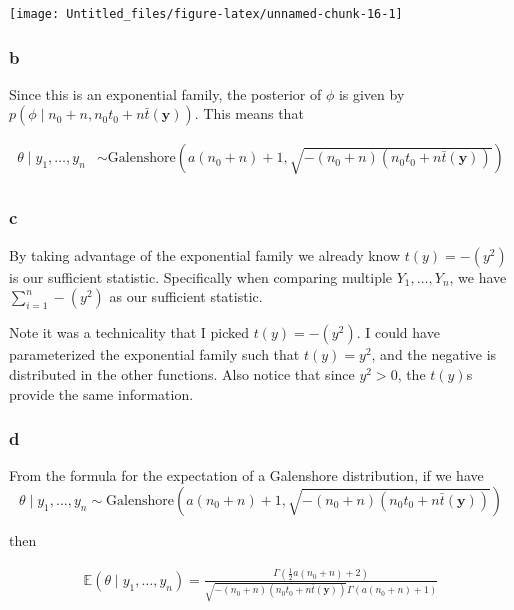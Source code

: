 \documentclass[
]{article}
\begin{document}
\begin{center}\texttt{[image: Untitled\_files/figure-latex/unnamed-chunk-16-1]} \end{center}

\hypertarget{b-4}{%
\subsubsection{b}\label{b-4}}

Since this is an exponential family, the posterior of \(\phi\) is given
by \(p(\phi \mid n_0 + n, n_0 t_0 + n\bar{t}(\mathbf{y}))\). This means
that

\begin{align}
\theta \mid y_1, \dots, y_n &\sim \text{Galenshore}\left(a (n_0 + n) + 1, \sqrt{- (n_0 + n) (n_0 t_0 + n \bar{t}(\mathbf{y}))} \right) \\
\end{align}

\hypertarget{c-3}{%
\subsubsection{c}\label{c-3}}

By taking advantage of the exponential family we already know
\(t(y) = -(y^2)\) is our sufficient statistic. Specifically when
comparing multiple \(Y_1, \dots, Y_n\), we have
\(\sum_{i = 1}^n - (y^2)\) as our sufficient statistic.

Note it was a technicality that I picked \(t(y) = -(y^2)\). I could have
parameterized the exponential family such that \(t(y) = y^2\), and the
negative is distributed in the other functions. Also notice that since
\(y^2 > 0\), the \(t(y)\)s provide the same information.

\hypertarget{d-2}{%
\subsubsection{d}\label{d-2}}

From the formula for the expectation of a Galenshore distribution, if we
have
\[\theta \mid y_1, \dots, y_n \sim \text{Galenshore}\left(a (n_0 + n) + 1, \sqrt{- (n_0 + n) (n_0 t_0 + n \bar{t}(\mathbf{y}))} \right)\]

then

\begin{align}
\mathbb{E}(\theta \mid y_1, \dots, y_n) = \frac{\Gamma\left(\frac{1}{2} a(n_0 + n) + 2 \right)}{ \sqrt{- (n_0 + n) (n_0 t_0 + n \bar{t}(\mathbf{y}))} \Gamma\left( a(n_0 + n) + 1 \right)}
\end{align}
\end{document}
